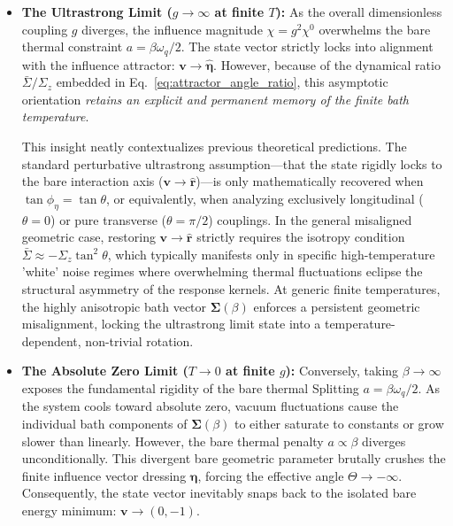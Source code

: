 \begin{itemize}
    \item \textbf{The Ultrastrong Limit ($g \to \infty$ at finite $T$):} As the overall dimensionless coupling $g$ diverges, the influence magnitude $\chi = g^2 \chi^0$ overwhelms the bare thermal constraint $a = \beta\omega_q/2$. The state vector strictly locks into alignment with the influence attractor: $\boldsymbol{v} \to \hat{\boldsymbol{\eta}}$. However, because of the dynamical ratio $\bar{\Sigma}/\Sigma_z$ embedded in Eq.~\eqref{eq:attractor_angle_ratio}, this asymptotic orientation \emph{retains an explicit and permanent memory of the finite bath temperature}. 
    
    This insight neatly contextualizes previous theoretical predictions. The standard perturbative ultrastrong assumption—that the state rigidly locks to the bare interaction axis ($\boldsymbol{v} \to \hat{\boldsymbol{r}}$)---is only mathematically recovered when $\tan\phi_\eta = \tan\theta$, or equivalently, when analyzing exclusively longitudinal ($\theta=0$) or pure transverse ($\theta=\pi/2$) couplings. In the general misaligned geometric case, restoring $\boldsymbol{v} \to \hat{\boldsymbol{r}}$ strictly requires the isotropy condition $\bar{\Sigma} \approx -\Sigma_z \tan^2 \theta$, which typically manifests only in specific high-temperature 'white' noise regimes where overwhelming thermal fluctuations eclipse the structural asymmetry of the response kernels. At generic finite temperatures, the highly anisotropic bath vector $\boldsymbol{\Sigma}(\beta)$ enforces a persistent geometric misalignment, locking the ultrastrong limit state into a temperature-dependent, non-trivial rotation.
    
    \item \textbf{The Absolute Zero Limit ($T \to 0$ at finite $g$):} Conversely, taking $\beta \to \infty$ exposes the fundamental rigidity of the bare thermal Splitting $a = \beta\omega_q/2$. As the system cools toward absolute zero, vacuum fluctuations cause the individual bath components of $\boldsymbol{\Sigma}(\beta)$ to either saturate to constants or grow slower than linearly. However, the bare thermal penalty $a \propto \beta$ diverges unconditionally. This divergent bare geometric parameter brutally crushes the finite influence vector dressing $\boldsymbol{\eta}$, forcing the effective angle $\Theta \to -\infty$. Consequently, the state vector inevitably snaps back to the isolated bare energy minimum: $\boldsymbol{v} \to (0, -1)$.
\end{itemize}


